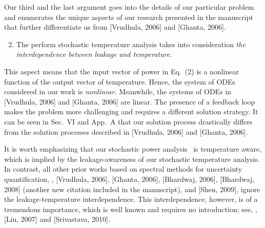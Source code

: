 \begin{authors}
Our third and the last argument goes into the details of our particular problem and enumerates the unique aspects of our research presented in the manuscript that further differentiate us from [Vrudhula, 2006] and [Ghanta, 2006].
\begin{enumerate}
  \setcounter{enumi}{1}
  \item The perform stochastic temperature analysis takes into consideration \emph{the interdependence between leakage and temperature}.
\end{enumerate}
This aspect means that the input vector of power in Eq.~(2) is a nonlinear function of the output vector of temperature.
Hence, the system of ODEs considered in our work is \emph{nonlinear}.
Meanwhile, the systems of ODEs in [Vrudhula, 2006] and [Ghanta, 2006] are linear.
The presence of a feedback loop makes the problem more challenging and requires a different solution strategy.
It can be seen in Sec.~VI and App.~A that our solution process drastically differs from the solution processes described in [Vrudhula, 2006] and [Ghanta, 2006].

It is worth emphasizing that our stochastic power analysis \perse\ is temperature aware, which is implied by the leakage-awareness of our stochastic temperature analysis.
In contrast, all other prior works based on spectral methods for uncertainty quantification, \ie, [Vrudhula, 2006], [Ghanta, 2006], [Bhardwaj, 2006], [Bhardwaj, 2008] (another new citation included in the manuscript), and [Shen, 2009], ignore the leakage-temperature interdependence.
This interdependence, however, is of a tremendous importance, which is well known and requires no introduction; see, \eg, [Liu, 2007] and [Srivastava, 2010].


\end{authors}
